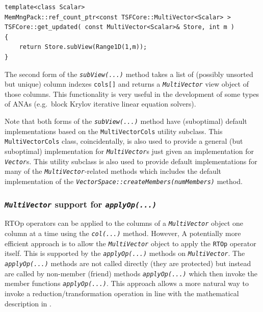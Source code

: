 {\tiny\begin{verbatim}
template<class Scalar>
MemMngPack::ref_count_ptr<const TSFCore::MultiVector<Scalar> >
TSFCore::get_updated( const MultiVector<Scalar>& Store, int m )
{
    return Store.subView(Range1D(1,m));
}
\end{verbatim}}

The second form of the \texttt{\textit{subView(...)}} method takes a
list of (possibly unsorted but unique) column indexes \texttt{cols[]}
and returns a \texttt{\textit{Multi\-Vector}} view object of those
columns.  This functionality is very useful in the development of some
types of ANAs (e.g.~block Krylov iterative linear equation solvers).

Note that both forms of the \texttt{\textit{subView(...)}} method have
(suboptimal) default implementations based on the
\texttt{MultiVectorCols} utility subclass.  This
\texttt{MultiVectorCols} class, coincidentally, is also used
to provide a general (but suboptimal) implementation for
\texttt{\textit{Multi\-Vector}}s just given an implementation for
\texttt{\textit{Vector}}s.  This utility subclass is also used to
provide default implementations for many of the
\texttt{\textit{Multi\-Vector}}-related methods which includes
the default implementation of the
\texttt{\textit{VectorSpace\-::createMembers(numMembers)}} method.

%
\subsubsection{\texttt{\textit{Multi\-Vector}} support for \texttt{\textit{applyOp(\-...)}}}
\label{tsfcore:sec:multi_vec_apply_op}
%

RTOp operators can be applied to the columns of a
\texttt{\textit{Multi\-Vector}} object one column at a time
using the \texttt{\textit{col(...)}} method.  However, A potentially
more efficient approach is to allow the
\texttt{\textit{Multi\-Vector}} object to apply the \texttt{RTOp} operator itself.
This is supported by the \texttt{\textit{applyOp(\-...)}} methods on
\texttt{\textit{Multi\-Vector}}.  The \texttt{\textit{applyOp(\-...)}} methods are not
called directly (they are protected) but instead are called by
non-member (friend) methods \texttt{\textit{applyOp(\-...)}} which then
invoke the member functions \texttt{\textit{applyOp(\-...)}}.  This
approach allows a more natural way to invoke a
reduction/transformation operation in line with the mathematical
description in \cite{ref:rtop_toms}.

